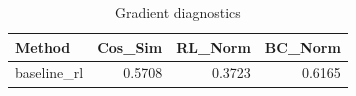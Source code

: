 \begin{table}[htbp]
\centering
\caption{Gradient diagnostics}
\label{tab:grad-diag}
\begin{tabular}{lrrr}
\toprule
\textbf{Method} & \textbf{Cos\_Sim} & \textbf{RL\_Norm} & \textbf{BC\_Norm} \\
\midrule
baseline\_rl & 0.5708 & 0.3723 & 0.6165 \\
\bottomrule
\end{tabular}
\end{table}